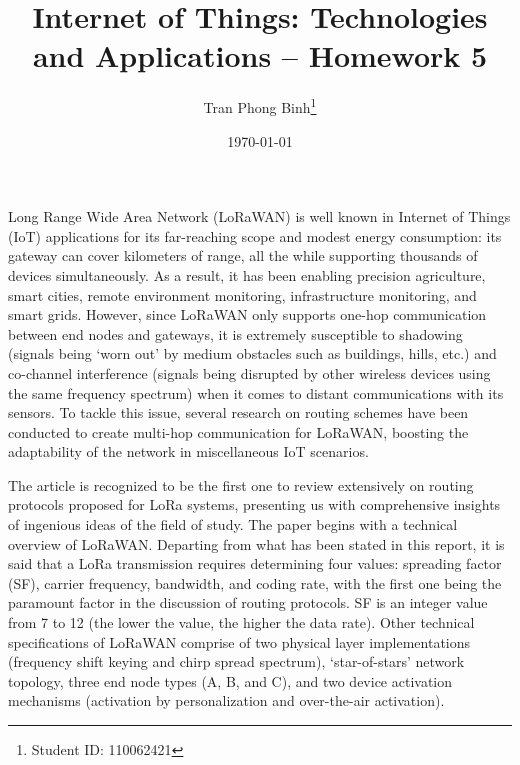 \documentclass[12pt, a4paper, onside]{article}
\title{\textbf{Internet of Things: Technologies and Applications -- Homework 5}}
\author{Tran Phong Binh\thanks{Student ID: 110062421}}
\affil{Department of Computer Science, National Tsing Hua University}
\date{\today}
\begin{document}
\maketitle

Long Range Wide Area Network (LoRaWAN) is well known in Internet of Things (IoT) applications for its far-reaching scope and modest energy consumption: its gateway can cover kilometers of range, all the while supporting thousands of devices simultaneously. As a result, it has been enabling precision agriculture, smart cities, remote environment monitoring, infrastructure monitoring, and smart grids. However, since LoRaWAN only supports one-hop communication between end nodes and gateways, it is extremely susceptible to shadowing (signals being `worn out' by medium obstacles such as buildings, hills, etc.) and co-channel interference (signals being disrupted by other wireless devices using the same frequency spectrum) when it comes to distant communications with its sensors. To tackle this issue, several research on routing schemes have been conducted to create multi-hop communication for LoRaWAN, boosting the adaptability of the network in miscellaneous IoT scenarios.

The article \cite{loraRoute} is recognized to be the first one to review extensively on routing protocols proposed for LoRa systems, presenting us with comprehensive insights of ingenious ideas of the field of study. The paper begins with a technical overview of LoRaWAN. Departing from what has been stated in this report, it is said that a LoRa transmission requires determining four values: spreading factor (SF), carrier frequency, bandwidth, and coding rate, with the first one being the paramount factor in the discussion of routing protocols. SF is an integer value from 7 to 12 (the lower the value, the higher the data rate). Other technical specifications of LoRaWAN comprise of two physical layer implementations (frequency shift keying and chirp spread spectrum), `star-of-stars' network topology, three end node types (A, B, and C), and two device activation mechanisms (activation by personalization and over-the-air activation).
\end{document}
